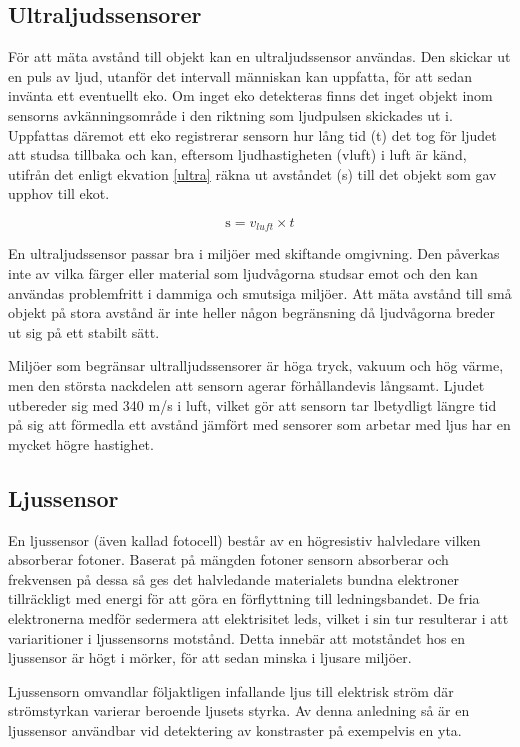 \documentclass[11pt]{article}
\begin{document}
\begin{flushleft}
\subsection{Ultraljudssensorer}
För att mäta avstånd till objekt kan en ultraljudssensor användas. Den skickar ut en puls av ljud, utanför det intervall människan kan uppfatta, för att sedan invänta ett eventuellt eko. Om inget eko detekteras finns det inget objekt inom sensorns avkänningsområde i den riktning som ljudpulsen skickades ut i. Uppfattas däremot ett eko registrerar sensorn hur lång tid (t) det tog för ljudet att studsa tillbaka och kan, eftersom ljudhastigheten (vluft) i luft är känd, utifrån det enligt ekvation \ref{ultra} räkna ut avståndet (s) till det objekt som gav upphov till ekot. 

\begin{equation}\label{ultra}
	\textrm{s} = v_{luft} \times t 				
\end{equation}

En ultraljudssensor passar bra i miljöer med skiftande omgivning. Den påverkas inte av vilka färger eller material som ljudvågorna studsar emot och den kan användas problemfritt i dammiga och smutsiga miljöer. Att mäta avstånd till små objekt på stora avstånd är inte heller någon begränsning då ljudvågorna breder ut sig på ett stabilt sätt.

Miljöer som begränsar ultralljudssensorer är höga tryck, vakuum och hög värme, men den största nackdelen att sensorn agerar förhållandevis långsamt. Ljudet utbereder sig med 340 m/s i luft, vilket gör att sensorn tar lbetydligt längre tid på sig att förmedla ett avstånd jämfört med sensorer som arbetar med ljus har en mycket högre hastighet. 

\subsection{Ljussensor}
En ljussensor (även kallad fotocell) består av en högresistiv halvledare vilken absorberar fotoner. Baserat på mängden fotoner sensorn absorberar och frekvensen på dessa så ges det halvledande materialets bundna elektroner tillräckligt med energi för att göra en förflyttning till ledningsbandet. De fria elektronerna medför sedermera att elektrisitet leds,  vilket i sin tur resulterar i att variaritioner i ljussensorns motstånd. Detta innebär att motståndet hos en ljussensor är högt i mörker, för att sedan minska i ljusare miljöer. \cite{612896}

Ljussensorn omvandlar följaktligen infallande ljus till elektrisk ström där strömstyrkan varierar beroende ljusets styrka. Av denna anledning så är en ljussensor användbar vid detektering av konstraster på exempelvis en yta.  \cite{612896}


\end{flushleft}
\end{document}
